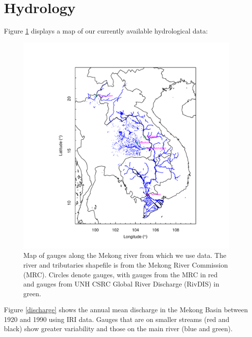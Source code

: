 \documentclass[11pt,english]{article}
\theoremstyle{plain} \newtheorem{claim}{Claim}
\theoremstyle{plain} \newtheorem{prop}{Proposition}
\theoremstyle{plain} \newtheorem{hypo}{Hypothesis}
\begin{document}
\section{Hydrology}

Figure \ref{fig:gauges} displays a map of our currently available hydrological data:

\begin{figure}
  \includegraphics{displays/gauges-map.pdf}
  \caption{Map of gauges along the Mekong river from which we use
    data.  The river and tributaries shapefile is from the Mekong
    River Commission (MRC).  Circles denote gauges, with gauges from the MRC in red and gauges from UNH CSRC Global River Discharge (RivDIS) in green.
    \label{fig:gauges}}
\end{figure}

Figure \ref{discharge} shows the annual mean discharge in the Mekong Basin between 1920 and 1990 using IRI data. Gauges that are on smaller streams (red and black) show greater variability and those on the main river (blue and green).
\end{document}
